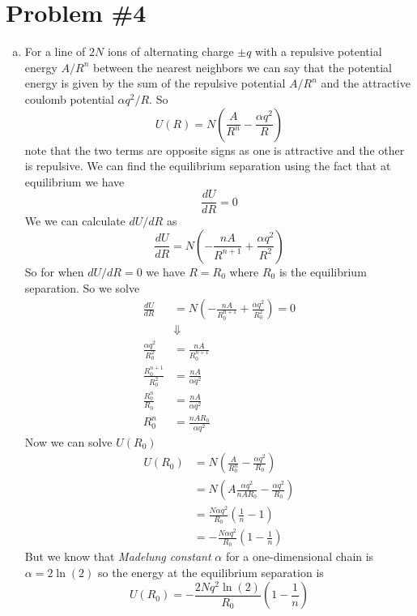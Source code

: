 \documentclass[11pt]{article}
\numberwithin{equation}{section}
\begin{document}
\section{Problem \#4}
\begin{enumerate}[(a)]
\item
For a line of $2N$ ions of alternating charge $\pm q$ with a repulsive potential energy $A/R^n$ between the nearest neighbors we can say that the potential energy is given by the sum of the repulsive potential $A/R^n$ and the attractive coulomb potential $\alpha q^2/R$. So
$$U(R) = N\left(\frac{A}{R^n}-\frac{\alpha q^2}{R}\right)$$
note that the two terms are opposite signs as one is attractive and the other is repulsive. We can find the equilibrium separation using the fact that at equilibrium we have
$$\frac{dU}{dR} = 0$$
We we can calculate $dU/dR$ as
$$\frac{dU}{dR} = N\left(-\frac{nA}{R^{n+1}} + \frac{\alpha q^2}{R^2}\right)$$
So for when $dU/dR=0$ we have $R=R_0$ where $R_0$ is the equilibrium separation. So we solve
\begin{align*}
\frac{dU}{dR} &=  N\left(-\frac{nA}{R_0^{n+1}} + \frac{\alpha q^2}{R_0^2}\right) = 0\\
&\Downarrow\\
\frac{\alpha q^2}{R_0^2} &= \frac{nA}{R_0^{n+1}} \\
\frac{R_0^{n+1}}{R_0^2} &= \frac{nA}{\alpha q^2} \\
\frac{R_0^{n}}{R_0} &= \frac{nA}{\alpha q^2} \\
R_0^{n} &= \frac{nAR_0}{\alpha q^2}
\end{align*}
Now we can solve $U(R_0)$
\begin{align*}
U(R_0) &= N\left(\frac{A}{R_0^n}-\frac{\alpha q^2}{R_0}\right)\\
&= N\left(A\frac{\alpha q^2}{nAR_0} - \frac{\alpha q^2}{R_0}\right)\\
&= \frac{N\alpha q^2}{R_0}\left(\frac{1}{n} - 1\right)\\
&= -\frac{N\alpha q^2}{R_0}\left(1-\frac{1}{n}\right)
\end{align*}
But we know that \emph{Madelung constant} $\alpha$ for a one-dimensional chain is $\alpha = 2\ln(2)$ so the energy at the equilibrium separation is
$$U(R_0) = -\frac{2Nq^2\ln(2)}{R_0}\left(1-\frac{1}{n}\right)$$


\end{enumerate}
\end{document}
